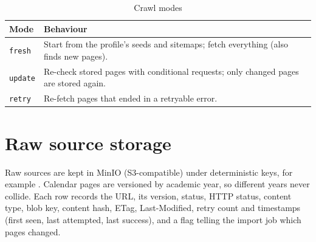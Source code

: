 \documentclass[11pt,letterpaper]{report}
\begin{document}
\begin{table}[H]
\centering
\caption{Crawl modes}\label{tab:crawlmodes}
\begin{tabularx}{\textwidth}{@{}P{2.2cm}L@{}}
\toprule
\textbf{Mode} & \textbf{Behaviour} \\
\midrule
\texttt{fresh} & Start from the profile's seeds and sitemaps; fetch everything (also finds new pages). \\
\texttt{update} & Re-check stored pages with conditional requests; only changed pages are stored again. \\
\texttt{retry} & Re-fetch pages that ended in a retryable error. \\
\bottomrule
\end{tabularx}
\end{table}

\section{Raw source storage}
Raw sources are kept in MinIO (S3-compatible) under deterministic keys, for example
. Calendar pages are versioned by
academic year, so different years never collide. Each  row records the URL, its
version, status, HTTP status, content type, blob key, content hash, ETag, Last-Modified, retry count and
timestamps (first seen, last attempted, last success), and a  flag telling the
import job which pages changed.
\end{document}
